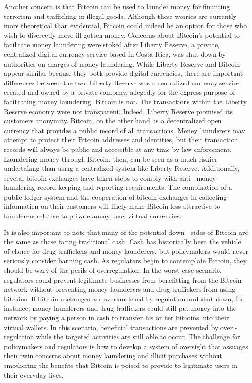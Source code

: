 Another concern is that Bitcoin can be used to launder money
for financing terrorism and trafficking in illegal goods. Although
these worries are currently more theoretical than evidential,
Bitcoin could indeed be an option for those who wish to discreetly
move ill-gotten money. Concerns about Bitcoin’s potential to
facilitate money laundering were stoked after Liberty Reserve, a
private, centralized digital-currency service based in Costa Rica,
was shut down by authorities on charges of money laundering.
While Liberty Reserve and Bitcoin appear similar because they
both provide digital currencies, there are important differences
between the two. Liberty Reserve was a centralized currency
service created and owned by a private company, allegedly for
the express purpose of facilitating money laundering. Bitcoin is
not. The transactions within the Liberty Reserve economy were
not transparent. Indeed, Liberty Reserve promised its customers
anonymity. Bitcoin, on the other hand, is a decentralized open
currency that provides a public record of all transactions. Money
launderers may attempt to protect their Bitcoin addresses and
identities, but their transaction records will always be public and
accessible at any time by law enforcement. Laundering money
through Bitcoin, then, can be seen as a much riskier undertaking
than using a centralized system like Liberty Reserve. Additionally, several bitcoin exchanges have taken steps to comply with anti–
money laundering record-keeping and reporting requirements.
The combination of a public ledger system and the cooperation of
bitcoin exchanges in collecting information on their customers
will likely make Bitcoin less attractive to launderers relative to
private anonymous virtual currencies\cite{hanley2013false}.

It is also important to note that many of the potential down -
sides of Bitcoin are the same as those facing traditional cash.
Cash has historically been the vehicle of choice for drug traffickers
and money launderers, but policymakers would never
seriously consider banning cash. As regulators begin to contemplate
Bitcoin, they should be wary of the perils of overregulation.
In the worst-case scenario, regulators could prevent legitimate
businesses from benefitting from the Bitcoin network without
preventing money launderers and drug traffickers from using
bitcoins. If bitcoin exchanges are overburdened by regulation
and shut down, for instance, money launderers and drug traffickers
could still put money into the network by paying a person
in cash to transfer his or her bitcoins into their virtual wallets.
In this scenario, beneficial transactions are prevented by over -
regulation while the targeted activities are still able to occur\cite{hanley2013false}.
The challenge for policymakers and regulators is how to develop
a system of oversight that assuages their twin concerns about
money laundering and illicit purchases without smothering the
benefits that Bitcoin is poised to provide to legitimate users in
their everyday lives.

